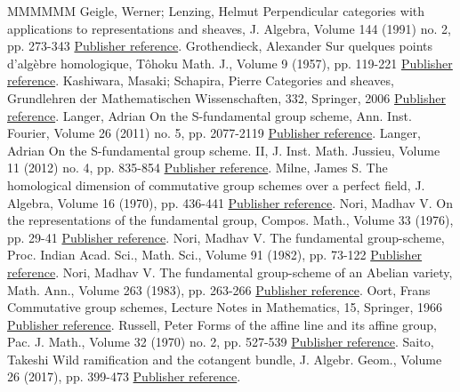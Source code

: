 \documentclass[11pt]{article}
\theoremstyle{definition}
\numberwithin{equation}{section}
\theoremstyle{remark}
\begin{document}
\begin{thebibliography}{MMMMMM}
 Geigle, Werner; Lenzing, Helmut Perpendicular categories with applications to representations and sheaves, J. Algebra, Volume 144 (1991) no. 2, pp. 273-343 \href{https://ahl.centre-mersenne.org/item/AHL_2020__3__1_0/#GL}{Publisher reference}.
 Grothendieck, Alexander Sur quelques points d’algèbre homologique, Tôhoku Math. J., Volume 9 (1957), pp. 119-221 \href{https://ahl.centre-mersenne.org/item/AHL_2020__3__1_0/#Grothendieck}{Publisher reference}.
 Kashiwara, Masaki; Schapira, Pierre Categories and sheaves, Grundlehren der Mathematischen Wissenschaften, 332, Springer, 2006 \href{https://ahl.centre-mersenne.org/item/AHL_2020__3__1_0/#KS}{Publisher reference}.
 Langer, Adrian On the S-fundamental group scheme, Ann. Inst. Fourier, Volume 26 (2011) no. 5, pp. 2077-2119 \href{https://ahl.centre-mersenne.org/item/AHL_2020__3__1_0/#La11}{Publisher reference}.
 Langer, Adrian On the S-fundamental group scheme. II, J. Inst. Math. Jussieu, Volume 11 (2012) no. 4, pp. 835-854 \href{https://ahl.centre-mersenne.org/item/AHL_2020__3__1_0/#La12}{Publisher reference}.
 Milne, James S. The homological dimension of commutative group schemes over a perfect field, J. Algebra, Volume 16 (1970), pp. 436-441 \href{https://ahl.centre-mersenne.org/item/AHL_2020__3__1_0/#Milne}{Publisher reference}.
 Nori, Madhav V. On the representations of the fundamental group, Compos. Math., Volume 33 (1976), pp. 29-41 \href{https://ahl.centre-mersenne.org/item/AHL_2020__3__1_0/#No76}{Publisher reference}.
 Nori, Madhav V. The fundamental group-scheme, Proc. Indian Acad. Sci., Math. Sci., Volume 91 (1982), pp. 73-122 \href{https://ahl.centre-mersenne.org/item/AHL_2020__3__1_0/#No82}{Publisher reference}.
 Nori, Madhav V. The fundamental group-scheme of an Abelian variety, Math. Ann., Volume 263 (1983), pp. 263-266 \href{https://ahl.centre-mersenne.org/item/AHL_2020__3__1_0/#No83}{Publisher reference}.
 Oort, Frans Commutative group schemes, Lecture Notes in Mathematics, 15, Springer, 1966 \href{https://ahl.centre-mersenne.org/item/AHL_2020__3__1_0/#Oort}{Publisher reference}.
 Russell, Peter Forms of the affine line and its affine group, Pac. J. Math., Volume 32 (1970) no. 2, pp. 527-539 \href{https://ahl.centre-mersenne.org/item/AHL_2020__3__1_0/#Russell}{Publisher reference}.
 Saito, Takeshi Wild ramification and the cotangent bundle, J. Algebr. Geom., Volume 26 (2017), pp. 399-473 \href{https://ahl.centre-mersenne.org/item/AHL_2020__3__1_0/#Saito}{Publisher reference}.

\end{thebibliography}
\end{document}
